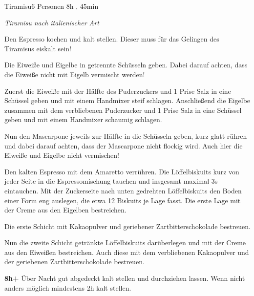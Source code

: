 \documentclass[../recipe-collections/cooking.tex]{subfiles}
\begin{document}
\begin{recipe}{Tiramisu}{6 Personen }{8h , 45min }


  \freeform{}\textit{Tiramisu nach italienischer Art}


  Den Espresso kochen und kalt stellen.
  Dieser muss für das Gelingen des Tiramisus eiskalt sein!



  Die Eiweiße und Eigelbe in getrennte Schüsseln geben.
  Dabei darauf achten, dass die Eiweiße nicht mit Eigelb vermischt werden!


  Zuerst die Eiweiße mit der Hälfte des Puderzuckers und 1 Prise Salz in eine Schüssel geben und mit einem Handmixer steif schlagen.
  Anschließend die Eigelbe zusammen mit dem verbliebenen Puderzucker und 1 Prise Salz in eine Schüssel geben und mit einem Handmixer schaumig schlagen.


  Nun den Mascarpone jeweils zur Hälfte in die Schüsseln geben, kurz glatt rühren und dabei darauf achten, dass der Mascarpone nicht flockig wird.
  Auch hier die Eiweiße und Eigelbe nicht vermischen!


  Den kalten Espresso mit dem Amaretto verrühren.
  Die Löffelbiskuits kurz von jeder Seite in die Espressomischung tauchen und insgesamt maximal 3s eintauchen.
  Mit der Zuckerseite nach unten gedrehten Löffelbiskuits den Boden einer Form eng auslegen, die etwa 12 Biskuits je Lage fasst.
  Die erste Lage mit der Creme aus den Eigelben bestreichen.


  Die erste Schicht mit Kakaopulver und geriebener Zartbitterschokolade bestreuen.

  \newstep{}Nun die zweite Schicht getränkte Löffelbiskuits darüberlegen und mit der Creme aus den Eiweißen bestreichen.
  Auch diese mit dem verbliebenen Kakaopulver und der geriebenen Zartbitterschokolade bestreuen.

  \newstep{}
  \textbf{8h+}
  Über Nacht gut abgedeckt kalt stellen und durchziehen lassen.
  Wenn nicht anders möglich mindestens 2h kalt stellen.


\end{recipe}
\end{document}
